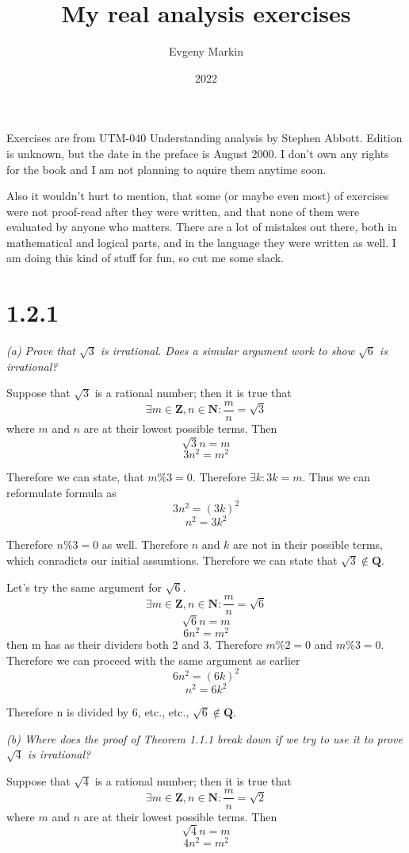 \documentclass[11pt,oneside,titlepage]{article}
\title{My real analysis exercises}
\author{Evgeny Markin}
\date{2022}
\begin{document}
\maketitle

Exercises are from UTM-040 Understanding analysis by Stephen Abbott. Edition is
unknown, but the date in the preface is August 2000. I don't own any rights
for the book and I am not planning to aquire them anytime soon. 

Also it wouldn't hurt to mention, that some (or maybe even most) of exercises
were not proof-read after they were written,  and that none of them were
evaluated by anyone who matters. There are a lot of mistakes out  there, both
in mathematical and logical parts, and in the language they were written as
well. I am doing this kind of stuff for fun, so cut me some slack.

\section*{1.2.1}
\textit{(a) Prove that $\sqrt{3}$ is irrational. Does a simular argument work
  to show $\sqrt{6}$ is irrational?}

Suppose that $\sqrt{3}$ is a rational number; then it is true that
$$\exists m \in \textbf{Z}, n \in \textbf{N}: \frac{m}{n} = \sqrt{3}$$
where $m$ and $n$ are at their lowest possible terms. Then
$$\sqrt{3}n = m$$
$$3n^2 = m^2$$

Therefore we can state, that $m \% 3 = 0$. Therefore $\exists k: 3k = m$.
Thus we can reformulate formula as
$$3n^2 = (3k)^2$$
$$n^2 = 3k^2$$

Therefore $n\%3 = 0$ as well. Therefore $n$ and $k$ are not in their possible
terms, which conradicts our initial assumtions. Therefore we can state that
$\sqrt{3} \notin \textbf{Q}$.

Let's try the same argument for $\sqrt{6}$.
$$\exists m \in \textbf{Z}, n \in \textbf{N}: \frac{m}{n} = \sqrt{6}$$
$$\sqrt{6}n = m$$
$$6n^2 = m^2$$
then m has as their dividers both 2 and 3. Therefore $m\%2 = 0$ and $m\%3 = 0$.
Therefore we can proceed with the same argument as earlier
$$6n^2 = (6k)^2$$
$$n^2 = 6k^2$$

Therefore n is divided by 6, etc., etc., $\sqrt{6} \notin \textbf{Q}$.

\textit{(b) Where does the proof of Theorem 1.1.1 break down if we try to use
  it to prove $\sqrt{4}$ is irrational? }

Suppose that $\sqrt{4}$ is a rational number; then it is true that
$$\exists m \in \textbf{Z}, n \in \textbf{N}: \frac{m}{n} = \sqrt{2}$$
where $m$ and $n$ are at their lowest possible terms. Then
$$\sqrt{4}n = m$$
$$4n^2 = m^2$$
\end{document}

